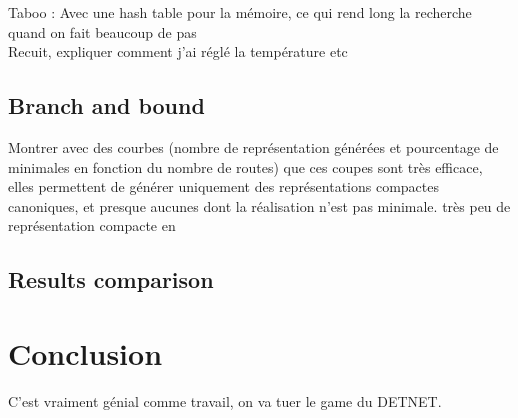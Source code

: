 \documentclass[english]{article}
\begin{document}
Taboo : Avec une hash table pour la mémoire, ce qui rend long la recherche quand on fait beaucoup de pas\\

Recuit, expliquer comment j'ai réglé la température etc\\

\subsection{Branch and bound}

Montrer avec des courbes (nombre de représentation générées et pourcentage de minimales en fonction du nombre de routes) que ces coupes sont très efficace, elles permettent de générer uniquement des représentations compactes canoniques, et presque aucunes dont la réalisation n'est pas minimale.
très peu de représentation compacte en  



\subsection{Results comparison}

\section{Conclusion}
C'est vraiment génial comme travail, on va tuer le game du DETNET.



\end{document}
